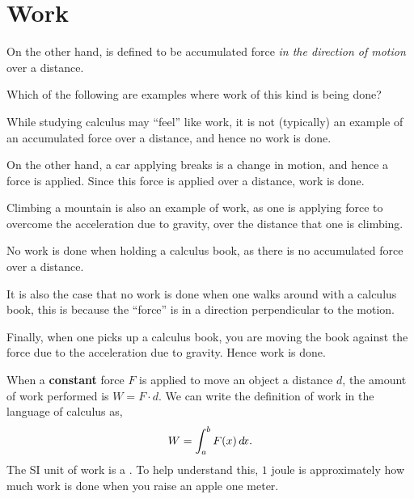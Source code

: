 \documentclass{ximera}
\begin{document}
\section{Work}

On the other hand,  is defined to be accumulated force
\textit{in the direction of motion} over a distance.
\begin{question}
  Which of the following are examples where work of this kind is being done?
  \begin{selectAll}
  \end{selectAll}
  \begin{feedback}
    While studying calculus may ``feel'' like work, it is not
    (typically) an example of an accumulated force over a distance,
    and hence no work is done.

    On the other hand, a car applying breaks is a change in motion, and
    hence a force is applied. Since this force is applied over a
    distance, work is done.

    Climbing a mountain is also an example of work, as one is applying
    force to overcome the acceleration due to gravity, over the
    distance that one is climbing.

    No work is done when holding a calculus book, as there is no
    accumulated force over a distance.

    It is also the case that no work is done when one walks around
    with a calculus book, this is because the ``force'' is in a
    direction perpendicular to the motion.

    Finally, when one picks up a calculus book, you are moving the
    book against the force due to the acceleration due to
    gravity. Hence work is done.
  \end{feedback}
\end{question}

When a \textbf{constant} force $F$ is applied to move an object a
distance $d$, the amount of work performed is $W=F\cdot d$.  We can
write the definition of work in the language of calculus as,
\[
W = \int_{a}^{b} F(x) \mathop{}\!d\! x.
\]
The SI unit of work is a . To help understand this, $1$
joule is approximately how much work is done when you raise an apple
one meter.
\end{document}
